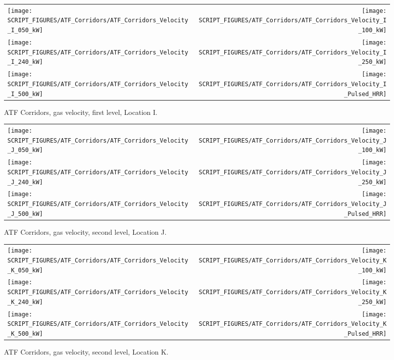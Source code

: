 \begin{figure}[p]
\begin{tabular*}{\textwidth}{l@{\extracolsep{\fill}}r}
\texttt{[image: SCRIPT\_FIGURES/ATF\_Corridors/ATF\_Corridors\_Velocity\_I\_050\_kW]} &
\texttt{[image: SCRIPT\_FIGURES/ATF\_Corridors/ATF\_Corridors\_Velocity\_I\_100\_kW]} \\
\texttt{[image: SCRIPT\_FIGURES/ATF\_Corridors/ATF\_Corridors\_Velocity\_I\_240\_kW]} &
\texttt{[image: SCRIPT\_FIGURES/ATF\_Corridors/ATF\_Corridors\_Velocity\_I\_250\_kW]} \\
\texttt{[image: SCRIPT\_FIGURES/ATF\_Corridors/ATF\_Corridors\_Velocity\_I\_500\_kW]} &
\texttt{[image: SCRIPT\_FIGURES/ATF\_Corridors/ATF\_Corridors\_Velocity\_I\_Pulsed\_HRR]}
\end{tabular*}
\caption[ATF Corridors, gas velocity, first level, Location I]{ATF Corridors, gas velocity, first level, Location I.}
\label{ATF_Velocity_I}
\end{figure}

\begin{figure}[p]
\begin{tabular*}{\textwidth}{l@{\extracolsep{\fill}}r}
\texttt{[image: SCRIPT\_FIGURES/ATF\_Corridors/ATF\_Corridors\_Velocity\_J\_050\_kW]} &
\texttt{[image: SCRIPT\_FIGURES/ATF\_Corridors/ATF\_Corridors\_Velocity\_J\_100\_kW]} \\
\texttt{[image: SCRIPT\_FIGURES/ATF\_Corridors/ATF\_Corridors\_Velocity\_J\_240\_kW]} &
\texttt{[image: SCRIPT\_FIGURES/ATF\_Corridors/ATF\_Corridors\_Velocity\_J\_250\_kW]} \\
\texttt{[image: SCRIPT\_FIGURES/ATF\_Corridors/ATF\_Corridors\_Velocity\_J\_500\_kW]} &
\texttt{[image: SCRIPT\_FIGURES/ATF\_Corridors/ATF\_Corridors\_Velocity\_J\_Pulsed\_HRR]}
\end{tabular*}
\caption[ATF Corridors, gas velocity, second level, Location J]{ATF Corridors, gas velocity, second level, Location J.}
\label{ATF_Velocity_J}
\end{figure}

\begin{figure}[p]
\begin{tabular*}{\textwidth}{l@{\extracolsep{\fill}}r}
\texttt{[image: SCRIPT\_FIGURES/ATF\_Corridors/ATF\_Corridors\_Velocity\_K\_050\_kW]} &
\texttt{[image: SCRIPT\_FIGURES/ATF\_Corridors/ATF\_Corridors\_Velocity\_K\_100\_kW]} \\
\texttt{[image: SCRIPT\_FIGURES/ATF\_Corridors/ATF\_Corridors\_Velocity\_K\_240\_kW]} &
\texttt{[image: SCRIPT\_FIGURES/ATF\_Corridors/ATF\_Corridors\_Velocity\_K\_250\_kW]} \\
\texttt{[image: SCRIPT\_FIGURES/ATF\_Corridors/ATF\_Corridors\_Velocity\_K\_500\_kW]} &
\texttt{[image: SCRIPT\_FIGURES/ATF\_Corridors/ATF\_Corridors\_Velocity\_K\_Pulsed\_HRR]}
\end{tabular*}
\caption[ATF Corridors, gas velocity, second level, Location K]{ATF Corridors, gas velocity, second level, Location K.}
\label{ATF_Velocity_K}
\end{figure}


